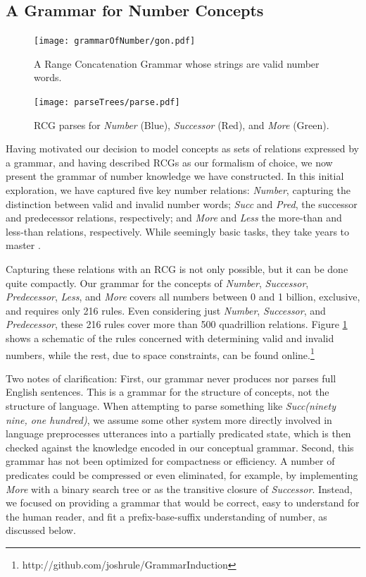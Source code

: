 \documentclass[10pt,letterpaper]{article}
\begin{document}
\subsection{A Grammar for Number Concepts}

\begin{figure}[t]
  \begin{centering}
    \texttt{[image: grammarOfNumber/gon.pdf]}
    \caption{A Range Concatenation Grammar whose strings are valid number words.}
    \label{fig:gon}
  \end{centering}
\end{figure}

\begin{figure}[t]
  \begin{centering}
    \texttt{[image: parseTrees/parse.pdf]}
    \caption{RCG parses for \emph{Number} (Blue), \emph{Successor} (Red), and \emph{More} (Green).}
    \label{fig:parse}
  \end{centering}
\end{figure}

Having motivated our decision to model concepts as sets of relations
expressed by a grammar, and having described RCGs as our formalism of
choice, we now present the grammar of number knowledge we have
constructed. In this initial exploration, we have captured five key
number relations: \emph{Number}, capturing the distinction between
valid and invalid number words; \emph{Succ} and \emph{Pred}, the
successor and predecessor relations, respectively; and \emph{More} and
\emph{Less} the more-than and less-than relations, respectively. While
seemingly basic tasks, they take years to master
\citep{FusRicBriar1982}.

Capturing these relations with an RCG is not only possible, but it can
be done quite compactly. Our grammar for the concepts of
\emph{Number}, \emph{Successor}, \emph{Predecessor}, \emph{Less}, and
\emph{More} covers all numbers between 0 and 1 billion, exclusive, and
requires only 216 rules. Even considering just \emph{Number},
\emph{Successor}, and \emph{Predecessor}, these 216 rules cover more
than 500 quadrillion relations. Figure \ref{fig:gon} shows a schematic
of the rules concerned with determining valid and invalid numbers,
while the rest, due to space constraints, can be found
online.\footnote{http://github.com/joshrule/GrammarInduction}

Two notes of clarification: First, our grammar never produces nor
parses full English sentences. This is a grammar for the structure of
concepts, not the structure of language. When attempting to parse
something like \emph{Succ(ninety nine, one hundred)}, we assume some
other system more directly involved in language preprocesses
utterances into a partially predicated state, which is then checked
against the knowledge encoded in our conceptual grammar. Second, this
grammar has not been optimized for compactness or efficiency. A number
of predicates could be compressed or even eliminated, for example, by
implementing \emph{More} with a binary search tree or as the
transitive closure of \emph{Successor}. Instead, we focused on
providing a grammar that would be correct, easy to understand for the
human reader, and fit a prefix-base-suffix understanding of number, as
discussed below.
\end{document}
